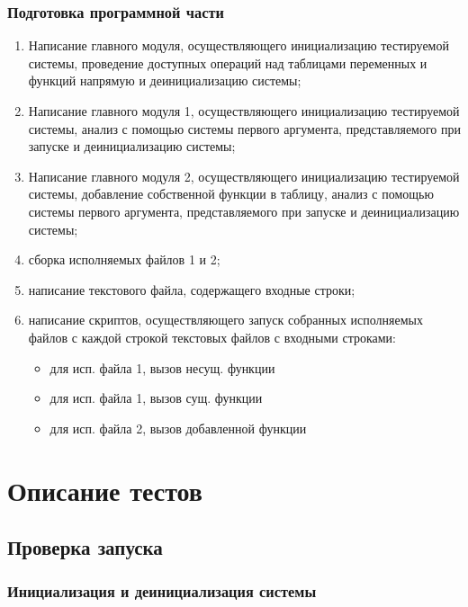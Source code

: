 \documentclass[a4paper, 12pt]{article}
\begin{document}
\subsubsection{Подготовка программной части} %
\begin{enumerate}
	\item Написание главного модуля, осуществляющего инициализацию
		тестируемой системы, проведение доступных операций над 
		таблицами переменных и функций напрямую
		и деинициализацию системы;
	\item Написание главного модуля 1, осуществляющего инициализацию
		тестируемой системы, анализ с помощью системы первого аргумента,
		представляемого при запуске и деинициализацию системы;
	\item Написание главного модуля 2, осуществляющего инициализацию
		тестируемой системы, добавление собственной функции в таблицу, 
		анализ с помощью системы первого аргумента,
		представляемого при запуске и деинициализацию системы;
	\item сборка исполняемых файлов 1 и 2;
	\item написание текстового файла, содержащего входные строки;
	\item написание скриптов, осуществляющего запуск собранных исполняемых файлов
		с каждой строкой текстовых файлов с входными строками:
		\begin{itemize}
			\item для исп. файла 1, вызов несущ. функции
			\item для исп. файла 1, вызов сущ. функции
			\item для исп. файла 2, вызов добавленной функции
		\end{itemize}
\end{enumerate}



\section{Описание тестов}

\subsection{Проверка запуска} %
\subsubsection{Инициализация и деинициализация системы} %
\end{document}
